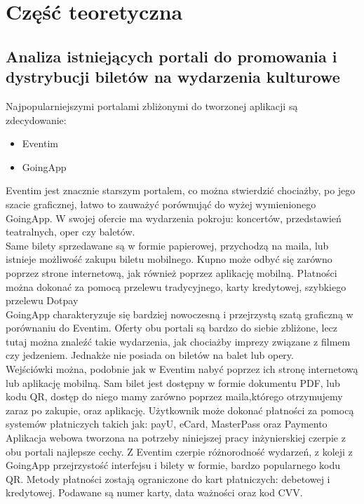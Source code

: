 \documentclass[12pt]{article}
\begin{document}
\begin{sloppypar}
\section{Część teoretyczna}
{
\subsection{Analiza istniejących portali do promowania i dystrybucji biletów na wydarzenia kulturowe}
{
  Najpopularniejszymi portalami zbliżonymi do tworzonej aplikacji są zdecydowanie:
  \begin{itemize}
    \item Eventim
    \item GoingApp
  \end{itemize}
  Eventim jest znacznie starszym portalem, co można stwierdzić chociażby, po jego szacie graficznej,
  łatwo to zauważyć porównująć do wyżej wymienionego GoingApp. 
  W swojej ofercie ma wydarzenia pokroju: koncertów, przedstawień teatralnych, oper czy baletów.\\
  Same bilety sprzedawane są w formie papierowej, przychodzą na maila, 
  lub istnieje możliwość zakupu biletu mobilnego. Kupno może odbyć się zarówno poprzez strone internetową, 
  jak również poprzez aplikację mobilną. Płatności można dokonać za pomocą przelewu tradycyjnego, karty kredytowej, szybkiego przelewu Dotpay\\
  GoingApp charakteryzuje się bardziej nowoczesną i przejrzystą szatą graficzną w porównaniu do Eventim. 
  Oferty obu portali są bardzo do siebie zbliżone, lecz tutaj można znaleźć takie wydarzenia, jak chociażby imprezy związane z filmem czy jedzeniem.
  Jednakże nie posiada on biletów na balet lub opery.\\
  Wejściówki można, podobnie jak w Eventim nabyć poprzez ich stronę internetową lub aplikację mobilną. 
  Sam bilet jest dostępny w formie dokumentu PDF, lub kodu QR, dostęp do niego mamy zarówno poprzez maila,którego otrzymujemy zaraz po zakupie, oraz aplikację.
  Użytkownik może dokonać płatności za pomocą systemów płatniczych takich jak: payU, eCard, MasterPass oraz Paymento\textregistered \\
  Aplikacja webowa tworzona na potrzeby niniejszej pracy inżynierskiej czerpie z obu portali najlepsze cechy. 
  Z Eventim czerpie różnorodność wydarzeń, z koleji z GoingApp przejrzystość interfejsu i bilety w formie, bardzo popularnego kodu QR.
  Metody płatności zostają ograniczone do kart płatniczych: debetowej i kredytowej. Podawane są numer karty, data ważności oraz kod CVV.
}
}
\end{sloppypar}
\end{document}
